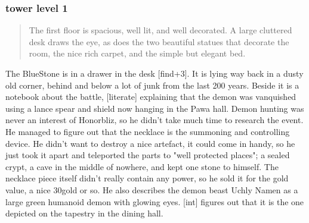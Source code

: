 \documentclass[11pt, twoside, titlepage, a4paper]{report}
\newenvironment{readoutloud}%
{\begin{quote}\begin{itshape}}%
{\end{itshape}\end{quote}}%
\begin{document}
\subsubsection*{tower level 1}
\begin{readoutloud}
The first floor is spacious, well lit, and well decorated. A large cluttered desk draws the eye, as does the two beautiful statues that decorate the room, the nice rich carpet, and the simple but elegant bed.
\end{readoutloud}

The BlueStone is in a drawer in the desk [find+3]. It is lying way back in a dusty old corner, behind and below a lot of junk from the last 200 years. Beside it is a notebook about the battle, [literate] explaining that the demon was vanquished using a lance spear and shield now hanging in the Pawa hall. Demon hunting was never an interest of Honorbliz, so he didn't take much time to research the event. He managed to figure out that the necklace is the summoning and controlling device. He didn't want to destroy a nice artefact, it could come in handy, so he just took it apart and teleported the parts to "well protected places"; a sealed crypt, a cave in the middle of nowhere, and kept one stone to himself. The necklace piece itself didn't really contain any power, so he sold it for the gold value, a nice 30gold or so. He also describes the demon beast Uchly Namen as a large green humanoid demon with glowing eyes. [int] figures out that it is the one depicted on the tapestry in the dining hall.
\end{document}
